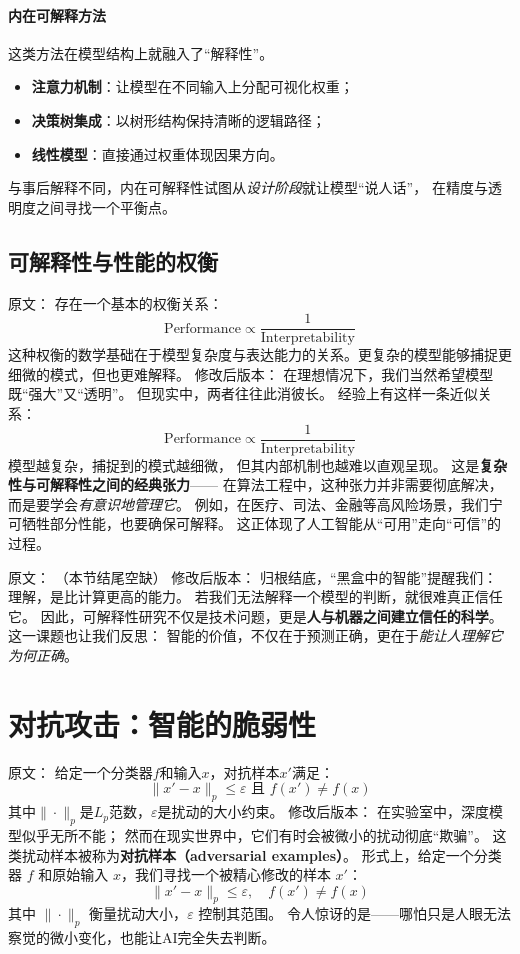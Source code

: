 \paragraph{内在可解释方法}  
这类方法在模型结构上就融入了“解释性”。  
\begin{itemize}
\item \textbf{注意力机制}：让模型在不同输入上分配可视化权重；  
\item \textbf{决策树集成}：以树形结构保持清晰的逻辑路径；  
\item \textbf{线性模型}：直接通过权重体现因果方向。  
\end{itemize}
与事后解释不同，内在可解释性试图从\textit{设计阶段}就让模型“说人话”，  
在精度与透明度之间寻找一个平衡点。



\subsection{可解释性与性能的权衡}

原文：
存在一个基本的权衡关系：
$$\text{Performance} \propto \frac{1}{\text{Interpretability}}$$
这种权衡的数学基础在于模型复杂度与表达能力的关系。更复杂的模型能够捕捉更细微的模式，但也更难解释。
修改后版本：
在理想情况下，我们当然希望模型既“强大”又“透明”。  
但现实中，两者往往此消彼长。  
经验上有这样一条近似关系：  
$$\text{Performance} \propto \frac{1}{\text{Interpretability}}$$  
模型越复杂，捕捉到的模式越细微，  
但其内部机制也越难以直观呈现。  
这是\textbf{复杂性与可解释性之间的经典张力}——  
在算法工程中，这种张力并非需要彻底解决，而是要学会\textit{有意识地管理它}。  
例如，在医疗、司法、金融等高风险场景，我们宁可牺牲部分性能，也要确保可解释。  
这正体现了人工智能从“可用”走向“可信”的过程。



原文：
（本节结尾空缺）
修改后版本：
归根结底，“黑盒中的智能”提醒我们：  
理解，是比计算更高的能力。  
若我们无法解释一个模型的判断，就很难真正信任它。  
因此，可解释性研究不仅是技术问题，更是\textbf{人与机器之间建立信任的科学}。  
这一课题也让我们反思：  
智能的价值，不仅在于预测正确，更在于\textit{能让人理解它为何正确}。


\section{对抗攻击：智能的脆弱性}

原文：
给定一个分类器$f$和输入$x$，对抗样本$x'$满足：
$$\|x' - x\|_p \leq \varepsilon \text{ 且 } f(x') \neq f(x)$$
其中$\|\cdot\|_p$是$L_p$范数，$\varepsilon$是扰动的大小约束。
修改后版本：
在实验室中，深度模型似乎无所不能；  
然而在现实世界中，它们有时会被微小的扰动彻底“欺骗”。  
这类扰动样本被称为\textbf{对抗样本（adversarial examples）}。  
形式上，给定一个分类器 $f$ 和原始输入 $x$，我们寻找一个被精心修改的样本 $x'$：  
$$\|x' - x\|_p \leq \varepsilon, \quad f(x') \neq f(x)$$  
其中 $\|\cdot\|_p$ 衡量扰动大小，$\varepsilon$ 控制其范围。  
令人惊讶的是——哪怕只是人眼无法察觉的微小变化，也能让AI完全失去判断。



